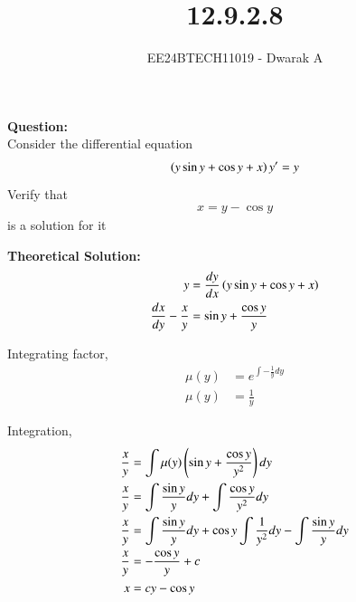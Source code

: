 \documentclass[journal]{IEEEtran}
\begin{document}

\vspace{3cm}

\title{12.9.2.8}
\author{EE24BTECH11019 - Dwarak A}
{\let\newpage\relax\maketitle}

\renewcommand{\thefigure}{\theenumi}
\renewcommand{\thetable}{\theenumi}
\setlength{\intextsep}{10pt} %


\renewcommand{\thetable}{\theenumi}

\textbf{Question:}\\
Consider the differential equation 
\begin{align}
    \left(y\sin{y}+\cos{y}+x\right)y^\prime=y
    \label{eqn:ode}
\end{align}
    Verify that
\begin{align}
    x=y-\cos{y}
    \label{eqn:soln}
\end{align}
    is a solution for it

\solution

\medskip

\textbf{Theoretical Solution:}
\begin{align}
    y &= \frac{dy}{dx}\left(y\sin{y}+\cos{y}+x\right) \\
    \frac{dx}{dy} - \frac{x}{y} &= \sin{y} + \frac{\cos{y}}{y}
\end{align}

Integrating factor,
\begin{align}
    \mu(y) &= e^{\int-\frac{1}{y}dy} \\
    \mu(y) &= \frac{1}{y}
\end{align}

Integration,
\begin{align}
    \frac{x}{y} &= \int\mu(y)\left(\sin{y}+\frac{\cos{y}}{y^2}\right)dy \\
    \frac{x}{y} &= \int\frac{\sin{y}}{y}dy+\int\frac{\cos{y}}{y^2}dy \\
    \frac{x}{y} &= \int\frac{\sin{y}}{y}dy+\cos{y}\int\frac{1}{y^2}dy-\int\frac{\sin{y}}{y}dy \\
    \frac{x}{y} &= -\frac{\cos{y}}{y}+c \\
    x &= cy-\cos{y}
    \label{eqn:gen_soln}
\end{align}
\end{document}
